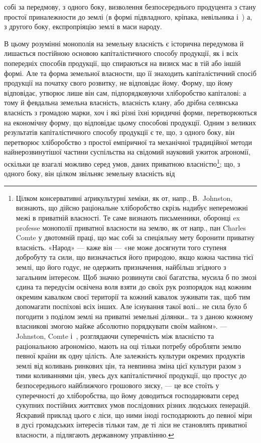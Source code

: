 \parcont{}  %
собі за передмову, з одного боку, визволення безпосереднього продуцента з стану
простої приналежности до землі (в формі підвладного, кріпака, невільника і~)
а, з другого боку, експропріяцію землі в маси народу.

В цьому розумінні монополія на земельну власність є історична передумова й
лишається постійною основою капіталістичного способу продукції, як і всіх попередніх
способів продукції, що спираються на визиск мас в тій або іншій
формі. Але та форма земельної власности, що її знаходить капіталістичний
спосіб продукції на початку свого розвитку, не відповідає йому. Форму, що йому
відповідає, утворює лише він сам, підпорядковуючи хліборобство капіталові:
а тому й февдальна земельна власність, власність клану, або дрібна селянська
власність з громадою марки, хоч і які різні їхні юридичні форми,
перетворюються на економічну форму, що відповідає цьому способові продукції.
Одним з великих результатів капіталістичного способу продукції є те, що, з одного
боку, він перетворює хліборобство з простої емпіричної та механічної
традиційної методи найнерозвинутішої частини суспільства на свідомий науковий
ужиток аґрономії, оскільки це взагалі можливо серед умов, даних приватною
власністю\footnote{
Цілком консервативні аґрикультурні хеміки, як от, напр., В.~Johnston, визнають, що дійсно
раціональне хліборобство скрізь надибує непереможні межі в приватній власності. Те саме визнають
письменники, оборонці ex professe монополії приватної власности на землю, як от напр., пан Charles
Comte у двотомній праці, що має собі за спеціяльну мету боронити приватну власність. «Народ» — каже
він — «не може досягнути того ступеня добробуту та сили, що визначається його природою, якщо
кожна частина тієї землі, що його годує, не одержить призначення, найбільш згідного з загальним
інтересом. Щоб значно розвинути свої багатства, мусила б по змозі єдина та передусім освічена воля
взяти до своїх рук розпорядок над кожним окремим кавалком своєї території та кожний кавалок зуживати
так, щоб тим допомагати поспіхові всіх інших. Але існування такої волі\dots{} не сила було б погодити
з поділом землі на приватні земельні ділянки\dots{} та з даною кожному власникові змогою майже абсолютно
порядкувати своїм майном». — Johnston, Comte і~, розглядаючи суперечність між власністю та
раціональною аґрономією, мають на оці тільки потребу обробляти землю певної країни як одну цілість.
Але залежність культури окремих продуктів землі від коливань ринкових цін, та невпинна зміна цієї
культури разом з тими коливаннями цін, увесь дух капіталістичної продукції, що простує до
безпосереднього
найближчого грошового зиску, — це все стоїть у суперечності до хліборобства, що йому
доводиться господарювати серед сукупних постійних життєвих умов послідовних різних людських
ґенерацій.
Яскравий приклад цього є ліси, що ними іноді господарюють до певної міри в дусі громадських
інтересів
тільки там, де ті ліси не становлять приватної власности, а підлягають державному управлінню.
}; що, з одного боку, він цілком звільняє земельну власність від
